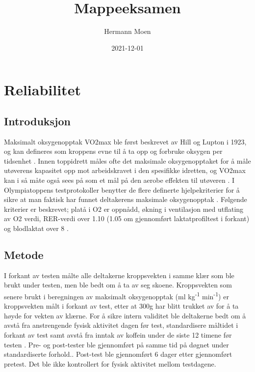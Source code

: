 \documentclass[
]{book}
\title{Mappeeksamen}
\author{Hermann Moen}
\date{2021-12-01}
\begin{document}
\maketitle

{
\setcounter{tocdepth}{1}
\tableofcontents
}
\hypertarget{reliabilitet}{%
\chapter{Reliabilitet}\label{reliabilitet}}

\hypertarget{introduksjon}{%
\section{Introduksjon}\label{introduksjon}}

Maksimalt oksygenopptak VO2max ble først beskrevet av Hill og Lupton i 1923, og kan defineres som kroppens evne til å ta opp og forbruke oksygen per tidsenhet \citep{bassett2000, hill1923}. Innen toppidrett måles ofte det maksimale oksygenopptaket for å måle utøverens kapasitet opp mot arbeidskravet i den spesifikke idretten, og VO2max kan i så måte også sees på som et mål på den aerobe effekten til utøveren \citep{bassett2000}. I Olympiatoppens testprotokoller benytter de flere definerte hjelpekriterier for å sikre at man faktisk har funnet deltakerens maksimale oksygenopptak \citep{tønnessen2017}. Følgende kriterier er beskrevet; platå i O2 er oppnådd, økning i ventilasjon med utflating av O2 verdi, RER-verdi over 1.10 (1.05 om gjennomført laktatprofiltest i forkant) og blodlaktat over 8 \citep{tønnessen2017}.

\hypertarget{metode}{%
\section{Metode}\label{metode}}

I forkant av testen målte alle deltakerne kroppsvekten i samme klær som ble brukt under testen, men ble bedt om å ta av seg skoene. Kroppsvekten som senere brukt i beregningen av maksimalt oksygenopptak (ml kg\textsuperscript{-1} min\textsuperscript{-1}) er kroppsvekten målt i forkant av test, etter at 300g har blitt trukket av for å ta høyde for vekten av klærne. For å sikre intern validitet ble deltakerne bedt om å avstå fra anstrengende fysisk aktivitet dagen før test, standardisere måltidet i forkant av test samt avstå fra inntak av koffein under de siste 12 timene før testen \citep{halperin2015} . Pre- og post-tester ble gjennomført på samme tid på døgnet under standardiserte forhold.. Post-test ble gjennomført 6 dager etter gjennomført pretest. Det ble ikke kontrollert for fysisk aktivitet mellom testdagene.
\end{document}
